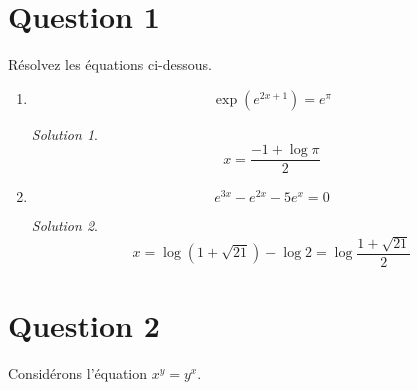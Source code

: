 \documentclass[
  12pt,
  letterpaper,
]{book}
\theoremstyle{remark}
\newtheorem*{solution}{Solution}
\begin{document}
\hypertarget{question-1}{%
\section{Question 1}\label{question-1}}

Résolvez les équations ci-dessous.

\begin{enumerate}
\item
  \[\exp(e^{2x+1})=e^{\pi}\]

  \begin{solution}

  \[x=\frac{-1+\log\pi}{2}\]

  \end{solution}
\item
  \[e^{3x}-e^{2x}-5e^x=0\]

  \begin{solution}

  \[x=\log\left(1+\sqrt{21}\right)-\log 2=\log\frac{1+\sqrt{21}}{2}\]

  \end{solution}
\end{enumerate}

\hypertarget{question-2}{%
\section{Question 2}\label{question-2}}

Considérons l'équation \(x^y=y^x\).
\end{document}
